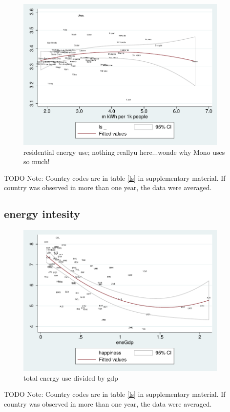 \documentclass[10pt, letterpaper]{article}
\begin{document}
\begin{spacing}{1.4}
\begin{figure}[H]
 \includegraphics[height=3in]{graphsAndTables/lfELERESls.pdf}\centering
\caption{residential energy use; nothing reallyu here...wonde why Mono uses so much!}\label{}
\end{figure}
{\scriptsize TODO Note: Country codes are in table \ref{ls} in supplementary
  material. If country was observed in more than one year, the data were averaged.}

\subsection{energy intesity}

\begin{figure}[H]
 \includegraphics[height=3in]{graphsAndTables/couWvsLsEnePerGdp.pdf}\centering
\caption{total energy use divided by gdp}\label{}
\end{figure}
{\scriptsize TODO Note: Country codes are in table \ref{ls} in supplementary
  material. If country was observed in more than one year, the data were averaged.}


\end{spacing}
\end{document}
